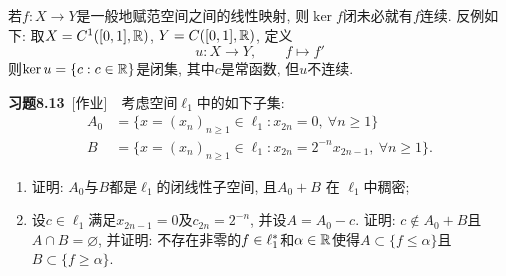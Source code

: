     \begin{Remark}
    若$ f : X\to Y $是一般地赋范空间之间的线性映射, 则$ \ker f $闭未必就有$ f $连续. 反例如下: 取$ X=C^1([0,1],\mathbb{R}) $, $ Y=C([0,1],\mathbb{R}) $, 定义
    \[
    u : X\to Y ,\qquad f\mapsto f'
    \]
    则$ \ker u=\{ c : c\in\mathbb{R} \} $是闭集, 其中$ c $是常函数, 但$ u $不连续.
    \end{Remark}

    \textbf{习题8.13}\ [作业]\ \ 考虑空间$ \ell_1 $中的如下子集:
    \[
    \begin{aligned}
    A_0&=\{ x=(x_n)_{n\geqslant 1}\in\ell_1 : x_{2n}=0,\ \forall n\geqslant 1 \}\\
    B&=\{ x=(x_n)_{n\geqslant 1}\in\ell_1 : x_{2n}=2^{-n}x_{2n-1},\ \forall n\geqslant 1 \}.
    \end{aligned}
    \]
    \begin{enumerate}[(1)]
    \item 证明: $ A_0 $与$ B $都是$ \ell_1 $的闭线性子空间, 且$ A_0+B$ 在 $\ell_1 $中稠密;
    \item 设$ c\in\ell_1 $满足$ x_{2n-1}=0 $及$ c_{2n}=2^{-n} $, 并设$ A=A_0-c $. 证明: $ c\notin A_0+B $且$ A\cap B=\varnothing $, 并证明: 不存在非零的$ f\in\ell_1^{*} $和$ \alpha\in\mathbb{R} $使得$ A\subset\{ f\leqslant\alpha \} $且$ B\subset\{ f\geqslant\alpha \} $.
    \end{enumerate}

